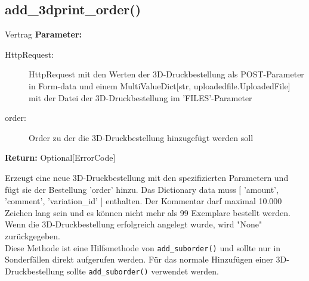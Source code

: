 \documentclass[12pt]{article}
\newcommand{\method}[1]{{\color{violet} \texttt{#1}}}
\newcommand{\insetContract}{12pt}
\newcommand{\insetMethodDescription}{-0.7cm}
\begin{document}
\subsection{add_3dprint_order()}
\begin{contract}{Vertrag}
    \textbf{Parameter:} 
    \begin{description}
        \item[\hspace{\insetContract} HttpRequest:] HttpRequest mit den Werten der 3D-Druckbestellung als POST-Parameter in Form-data und einem MultiValueDict[str, uploadedfile.UploadedFile] mit der Datei der 3D-Druckbestellung im 'FILES'-Parameter 
        \item[\hspace{\insetContract} order:]  Order zu der die 3D-Druckbestellung hinzugefügt werden soll 
    \end{description}
    \textbf{Return:}  Optional[ErrorCode]
\end{contract}
\hspace{\insetMethodDescription{}}
Erzeugt eine neue 3D-Druckbestellung mit den spezifizierten Parametern und fügt sie der Bestellung 'order' hinzu. Das Dictionary data muss $[$ 'amount', 'comment', 'variation_id' $]$ enthalten.
Der Kommentar darf maximal 10.000 Zeichen lang sein und es können nicht mehr als 99 Exemplare bestellt werden. 
Wenn die 3D-Druckbestellung erfolgreich angelegt wurde, wird "None" zurückgegeben. \\
Diese Methode ist eine Hilfsmethode von \method{add_suborder()} und sollte nur in Sonderfällen direkt aufgerufen werden. Für das normale Hinzufügen einer 3D-Druckbestellung sollte \method{add_suborder()} verwendet werden.
\enlargethispage*{5cm}
\end{document}
